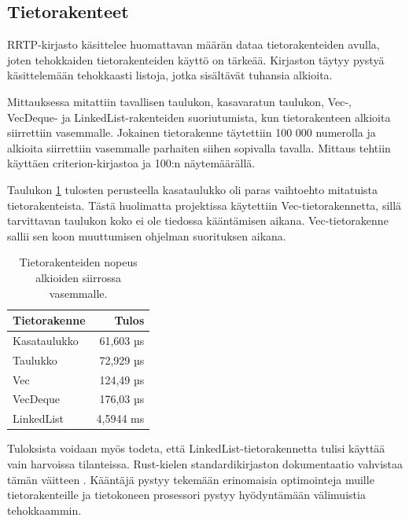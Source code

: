 \documentclass[a4paper,12pt]{article}
\begin{document}
    \subsection{Tietorakenteet}\label{sec:structures}
    RRTP-kirjasto käsittelee huomattavan määrän dataa tietorakenteiden avulla, joten tehokkaiden tietorakenteiden käyttö on tärkeää. Kirjaston täytyy pystyä käsittelemään tehokkaasti listoja, jotka sisältävät tuhansia alkioita. \par
    Mittauksessa mitattiin tavallisen taulukon, kasavaratun taulukon,
    Vec-, VecDeque- ja LinkedList-rakenteiden suoriutumista, kun tietorakenteen alkioita siirrettiin vasemmalle. Jokainen tietorakenne täytettiin 100 000 numerolla ja alkioita siirrettiin vasemmalle parhaiten siihen  sopivalla tavalla.
    Mittaus tehtiin käyttäen criterion-kirjastoa ja 100:n näytemäärällä.

    Taulukon \ref{tab:collection_bench} tulosten perusteella kasataulukko oli paras vaihtoehto mitatuista tietorakenteista. Tästä huolimatta projektissa käytettiin Vec-tietorakennetta, sillä tarvittavan taulukon koko ei ole tiedossa kääntämisen aikana. Vec-tietorakenne sallii sen koon muuttumisen ohjelman suorituksen aikana. 

    \begin{table}[h!]
        \centering
        \caption{Tietorakenteiden nopeus alkioiden siirrossa vasemmalle.}
        \label{tab:collection_bench}
        \begin{tabularx}{\textwidth}{|X|r|}
        \hline
            \textbf{Tietorakenne} & \textbf{Tulos}     \\ \hline
            Kasataulukko & 61,603 µs \\ \hline
            Taulukko     & 72,929 µs \\ \hline
            Vec          & 124,49 µs \\ \hline
            VecDeque     & 176,03 µs \\ \hline
            LinkedList   & 4,5944 ms \\ \hline
        \end{tabularx}
    \end{table}

    Tuloksista voidaan myös todeta, että LinkedList-tietorakennetta tulisi käyttää vain harvoissa tilanteissa. Rust-kielen standardikirjaston dokumentaatio vahvistaa tämän väitteen \cite[\textit{LinkedList}]{rust-std}. Kääntäjä pystyy tekemään erinomaisia optimointeja muille tietorakenteille ja tietokoneen prosessori pystyy hyödyntämään välimuistia tehokkaammin.
\end{document}
